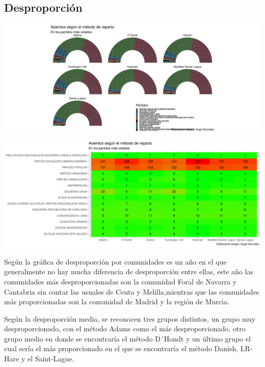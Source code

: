 \documentclass[12pt,a4paper,]{book}
\numberwithin{dummy}{section}
\theoremstyle{ocrenumbox}
\theoremstyle{blacknumex}
\theoremstyle{blacknumbox}
\theoremstyle{ocrenum}
\theoremstyle{ocrenum}
\begin{document}
\hypertarget{desproporciuxf3n-2}{%
\subsection{Desproporción}\label{desproporciuxf3n-2}}

\begin{center}\includegraphics[width=1\linewidth]{figurasR/unnamed-chunk-83-1} \end{center}

\begin{center}\includegraphics[width=1\linewidth]{figurasR/unnamed-chunk-83-2} \end{center}

Según la gráfica de desproporción por comunidades es un año en el que
generalmente no hay mucha diferencia de desproporción entre ellas, este
año las comunidades más desproporcionadas son la comunidad Foral de
Navarra y Cantabria sin contar las usuales de Ceuta y Melilla,mientras
que las comunidades más proporcionadas son la comunidad de Madrid y la
región de Murcia.

Según la desproporción media, se reconocen tres grupos distintos, un
grupo muy desproporcionado, con el método Adams como el más
desproporcionado, otro grupo medio en donde se encontraría el método
D´Hondt y un último grupo el cual sería el más proporcionado en el que
se encontraría el método Danish, LR-Hare y el Saint-Lague.
\end{document}
